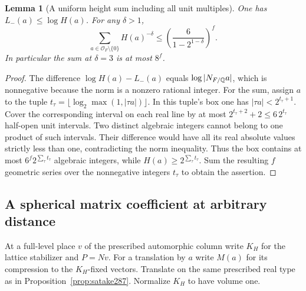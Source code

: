 \documentclass[a4paper,11pt]{article}
\newtheorem{lemma}[proposition]{Lemma}
\theoremstyle{definition}
\theoremstyle{remark}
\numberwithin{equation}{section}
\begin{document}
\begin{lemma}[A uniform height sum including all unit multiples]\leavevmode
\label{lem:height288}
One has \(L_-(a)\le\log H(a)\). For any \(\delta>1\),
\[
 \sum_{a\in\mathcal O_F\setminus\{0\}} H(a)^{-\delta}
       \le \left(\frac{6}{1-2^{1-\delta}}\right)^f .
\]
In particular the sum at \(\delta=3\) is at most \(8^f\).
\end{lemma}
\begin{proof}
The difference \(\log H(a)-L_-(a)\) equals
\(\log|N_{F/\mathbb Q}a|\), which is nonnegative because the norm
is a nonzero rational integer. For the sum, assign \(a\)
to the tuple \(t_\tau=\lfloor\log_2\max(1,|\tau a|)\rfloor\).
In this tuple's box one has \(|\tau a|<2^{t_\tau+1}\).
Cover the corresponding interval on each real line by at
most \(2^{t_\tau+2}+2\le 6\,2^{t_\tau}\) half-open unit
intervals. Two distinct algebraic integers cannot belong
to one product of such intervals. Their difference would
have all its real absolute values strictly less than one,
contradicting the norm inequality. Thus the box contains
at most \(6^f2^{\sum_\tau t_\tau}\) algebraic integers,
while \(H(a)\ge2^{\sum_\tau t_\tau}\). Sum the resulting
\(f\) geometric series over the nonnegative integers
\(t_\tau\) to obtain the assertion.
\end{proof}

\subsection{A spherical matrix coefficient at arbitrary distance}\label{nav:III-55}
At a full-level place \(v\) of the prescribed automorphic
column write \(K_H\) for the lattice stabilizer and
\(P=Nv\). For a translation by \(a\) write \(M(a)\) for
its compression to the \(K_H\)-fixed vectors. Translate
on the same prescribed real type as in
Proposition~\ref{prop:satake287}. Normalize \(K_H\) to
have volume one.
\end{document}
